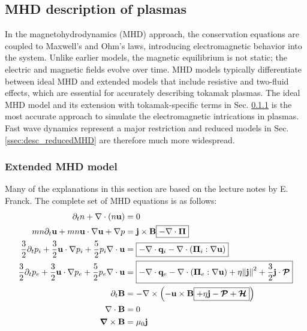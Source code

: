 \subsection{MHD description of plasmas}
\label{sec:desc_MHD}
In the magnetohydrodynamics (MHD) approach, the conservation equations are coupled to Maxwell's and Ohm's laws, introducing electromagnetic behavior into the system. Unlike earlier models, the magnetic equilibrium is not static; the electric and magnetic fields evolve over time. MHD models typically differentiate between ideal MHD and extended models that include resistive and two-fluid effects, which are essential for accurately describing tokamak plasmas. The ideal MHD model and its extension with tokamak-specific terms in Sec. \ref{ssec:desc_extendedMHD} is the most accurate approach to simulate the electromagnetic intrications in plasmas. Fast wave dynamics represent a major restriction and reduced models in Sec. \ref{ssec:desc_reducedMHD} are therefore much more widespread. 

\subsubsection{Extended MHD model}
\label{ssec:desc_extendedMHD}
Many of the explanations in this section are based on the lecture notes by E. Franck\cite{lessig2016fluid}. The complete set of MHD equations is as follows:
\begin{align}
	\partial_t n + \nabla \cdot (n \mathbf{u}) &= 0 \label{eq:desc_MHDmass} \\
	mn\partial_t\mathbf{u} + mn\mathbf{u}\cdot\nabla\mathbf{u} + \nabla p &= \mathbf{j} \times \mathbf{B} \boxed{- \nabla \cdot \boldsymbol{\Pi}} \label{eq:desc_MHDmomentum} \\
	\frac{3}{2}\partial_t p_i + \frac{3}{2} \mathbf{u} \cdot \nabla p_i + \frac{5}{2}p_i \nabla \cdot \mathbf{u} &= \boxed{- \nabla \cdot \mathbf{q}_i - \nabla \cdot (\boldsymbol{\Pi}_i : \nabla \mathbf{u})} \label{eq:desc_MHDionpressure} \\
	\frac{3}{2}\partial_t p_e + \frac{3}{2} \mathbf{u} \cdot \nabla p_e + \frac{5}{2}p_e \nabla \cdot \mathbf{u}  &= \boxed{- \nabla \cdot \mathbf{q}_e - \nabla \cdot (\boldsymbol{\Pi}_e : \nabla \mathbf{u}) + \eta \norm{\mathbf{j}}^2 + \frac{3}{2}\mathbf{j}\cdot \bm{\mathcal{P}}} \label{eq:desc_MHDelectronpressure} \\
	\partial_t \mathbf{B} &= -\nabla \times \left(-\mathbf{u} \times \mathbf{B} \boxed{+ \eta \mathbf{j} - \bm{\mathcal{P}} + \bm{\mathcal{H}}}\right) \label{eq:desc_MHDohmlaw} \\
	\nabla \cdot \mathbf{B} &= 0 \label{eq:desc_MHDgausslaw} \\
	\grad \times \mathbf{B} &= \mu_0 \mathbf{j} \label{eq:desc_MHDamperelaw}
\end{align}

